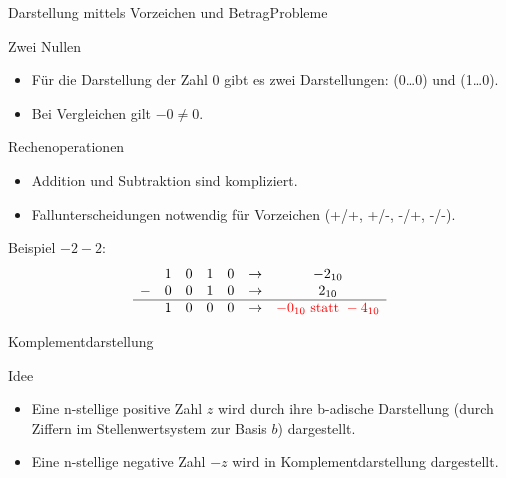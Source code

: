 \documentclass[xelatex,aspectratio=169]{beamer}
\begin{document}
\begin{frame}{Darstellung mittels Vorzeichen und Betrag}{Probleme}
  \begin{alertblock}{Zwei Nullen}
    \begin{itemize}
      \item Für die Darstellung der Zahl $0$ gibt es zwei Darstellungen: (0\ldots0) und (1\ldots 0).
      \item Bei Vergleichen gilt $-0 \neq 0$.
    \end{itemize}
  \end{alertblock}
  \begin{alertblock}{Rechenoperationen}
    \begin{itemize}
      \item Addition und Subtraktion sind kompliziert.
      \item Fallunterscheidungen notwendig für Vorzeichen (+/+, +/-, -/+, -/-).
    \end{itemize}
    Beispiel $-2 - 2$:
    \[
      \begin{matrix}
          & 1 & 0 & 1 & 0 & \rightarrow & -2_{10}                                         \\
        - & 0 & 0 & 1 & 0 & \rightarrow & 2_{10}                                          \\
        \hline
          & 1 & 0 & 0 & 0 & \rightarrow & \textcolor{red}{-0_{10} \text{ statt } -4_{10}} \\
      \end{matrix}
    \]
  \end{alertblock}
\end{frame}

\begin{frame}{Komplementdarstellung}
  \begin{block}{Idee}
    \begin{itemize}
      \item Eine n-stellige positive Zahl $z$ wird durch ihre b-adische Darstellung (durch Ziffern im Stellenwertsystem zur Basis $b$) dargestellt.
      \item Eine n-stellige negative Zahl $-z$ wird in Komplementdarstellung dargestellt.
    \end{itemize}
  \end{block}

\end{frame}
\end{document}
